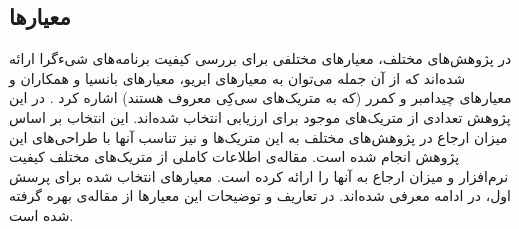 \subsection{معیارها}
در پژوهش‌های مختلف، معیارهای مختلفی برای بررسی کیفیت برنامه‌های شیءگرا ارائه شده‌اند که از آن جمله می‌توان به معیارهای ابریو\cite{quality_metrics_1,quality_metrics_2}، معیارهای بانسیا و همکاران\cite{quality_metrics_3} و معیارهای چیدامبر و کمرر (که به متریک‌های سی‌کِی معروف هستند) اشاره کرد \cite{quality_metrcs_ck}. در این پژوهش تعدادی از متریک‌های موجود برای ارزیابی انتخاب شده‌اند. این انتخاب بر اساس میزان ارجاع در پژوهش‌های مختلف به این متریک‌ها و نیز تناسب آنها با طراحی‌های این پژوهش انجام شده است. مقاله‌ی \cite{metrics_stateOfTheArt} اطلاعات کاملی از متریک‌های مختلف کیفیت نرم‌افزار و میزان ارجاع به آنها را ارائه کرده است. معیارهای انتخاب شده برای پرسش اول، در ادامه معرفی شده‌اند. در تعاریف و توضیحات این معیارها از مقاله‌ی \cite{metrics_stateOfTheArt} بهره گرفته شده است.
